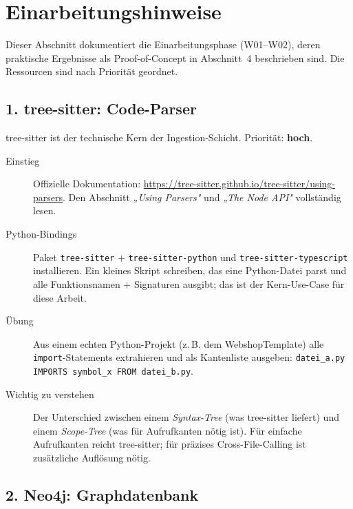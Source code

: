 \section{Einarbeitungshinweise}

Dieser Abschnitt dokumentiert die Einarbeitungsphase (W01--W02), deren praktische Ergebnisse als Proof-of-Concept in Abschnitt~4 beschrieben sind. Die Ressourcen sind nach Priorität geordnet.

\subsection*{1. tree-sitter: Code-Parser}

tree-sitter ist der technische Kern der Ingestion-Schicht. Priorität: \textbf{hoch}.

\begin{description}
  \item[Einstieg] Offizielle Dokumentation: \url{https://tree-sitter.github.io/tree-sitter/using-parsers}. Den Abschnitt \emph{„Using Parsers"} und \emph{„The Node API"} vollständig lesen.

  \item[Python-Bindings] Paket \texttt{tree-sitter} + \texttt{tree-sitter-python} und \texttt{tree-sitter-typescript} installieren. Ein kleines Skript schreiben, das eine Python-Datei parst und alle Funktionsnamen + Signaturen ausgibt; das ist der Kern-Use-Case für diese Arbeit.

  \item[Übung] Aus einem echten Python-Projekt (z.\,B. dem WebshopTemplate) alle \texttt{import}-Statements extrahieren und als Kantenliste ausgeben: \texttt{datei\_a.py IMPORTS symbol\_x FROM datei\_b.py}.

  \item[Wichtig zu verstehen] Der Unterschied zwischen einem \emph{Syntax-Tree} (was tree-sitter liefert) und einem \emph{Scope-Tree} (was für Aufrufkanten nötig ist). Für einfache Aufrufkanten reicht tree-sitter; für präzises Cross-File-Calling ist zusätzliche Auflösung nötig.
\end{description}

\subsection*{2. Neo4j: Graphdatenbank}


